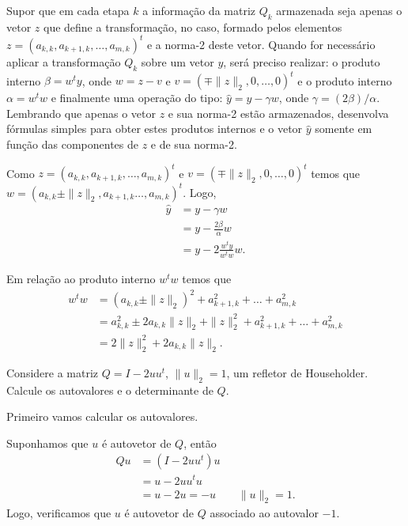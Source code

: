 \documentclass[a4paper,12pt, leqno, answers]{exam}
\begin{document}
\begin{questions}
    \question Supor que em cada etapa $k$ a informa\c{c}\~{a}o da matriz $Q_k$ armazenada seja apenas o vetor $z$ que define a transforma\c{c}\~{a}o, no caso, formado pelos elementos $z = \left( a_{k, k}, a_{k + 1, k}, \ldots, a_{m, k} \right)^t$ e a norma-2 deste vetor. Quando for necess\'{a}rio aplicar a transforma\c{c}\~{a}o $Q_k$ sobre um vetor $y$, ser\'{a} preciso realizar: o produto interno $\beta = w^t y$, onde $w = z - v$ e $v = \left( \mp \| z \|_2, 0, \ldots, 0 \right)^t$ e o produto interno $\alpha = w^t w$ e finalmente uma opera\c{c}\~{a}o do tipo: $\hat{y} = y - \gamma w$, onde $\gamma = \left( 2 \beta \right) / \alpha$. Lembrando que apenas o vetor $z$ e sua norma-2 est\~{a}o armazenados, desenvolva f\'{o}rmulas simples para obter estes produtos internos e o vetor $\hat{y}$ somente em fun\c{c}\~{a}o das componentes de $z$ e de sua norma-2.
    \begin{solution}
        Como $z = \left( a_{k, k}, a_{k + 1, k}, \ldots, a_{m, k} \right)^t$ e $v = \left( \mp \| z \|_2, 0, \ldots, 0 \right)^t$ temos que $w = \left( a_{k, k} \pm \| z \|_2, a_{k + 1, k} \ldots, a_{m, k}  \right)^t$. Logo,
        \begin{align*}
            \hat{y} &= y - \gamma w \\
            &= y - \frac{2 \beta}{\alpha} w \\
            &= y - 2 \frac{w^t y}{w^t w} w.
        \end{align*}

        Em rela\c{c}\~{a}o ao produto interno $w^t w$ temos que
        \begin{align*}
            w^t w &= \left( a_{k, k} \pm \| z \|_2 \right)^2 + a_{k + 1, k}^2 + \ldots + a_{m, k}^2 \\
            &= a_{k, k}^2 \pm 2 a_{k, k} \| z \|_2 + \| z \|_2^2 + a_{k + 1, k}^2 + \ldots + a_{m, k}^2 \\
            &= 2 \| z \|_2^2 + 2 a_{k, k} \| z \|_2.
        \end{align*}
    \end{solution}

    \question Considere a matriz $Q = I - 2 u u^t$, $\| u \|_2 = 1$, um refletor de Householder. Calcule os autovalores e o determinante de $Q$.
    \begin{solution}
       Primeiro vamos calcular os autovalores.

       Suponhamos que $u$ \'{e} autovetor de $Q$, ent\~{a}o
       \begin{align*}
           Q u &= \left( I - 2 u u^t \right) u \\
           &= u - 2 u u^t u \\
           &= u - 2 u = -u && \| u \|_2 = 1.
       \end{align*}
       Logo, verificamos que $u$ \'{e} autovetor de $Q$ associado ao autovalor $-1$.


\end{solution}
\end{questions}
\end{document}
